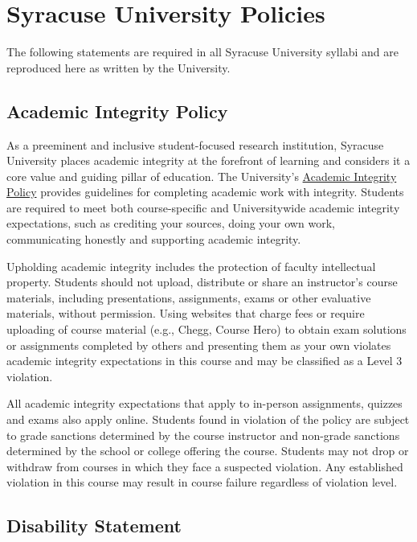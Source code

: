 \documentclass[12pt]{article}
\begin{document}
\newpage

\section*{Syracuse University Policies}

The following statements are required in all Syracuse University syllabi and are
reproduced here as written by the University.

\subsection*{Academic Integrity Policy}

As a preeminent and inclusive student-focused research institution, Syracuse University places academic integrity at the forefront of learning and considers it a core value and guiding pillar of education. The University's \href{https://policies.syr.edu/policies/academic-rules-student-responsibilities-and-services/academic-integrity-policy/}{Academic Integrity Policy} provides guidelines for completing academic work with integrity. Students are required to meet both course-specific and Universitywide academic integrity expectations, such as crediting your sources, doing your own work, communicating honestly and supporting academic integrity.

Upholding academic integrity includes the protection of faculty intellectual property. Students should not upload, distribute or share an instructor's course materials, including presentations, assignments, exams or other evaluative materials, without permission. Using websites that charge fees or require uploading of course material (e.g., Chegg, Course Hero) to obtain exam solutions or assignments completed by others and presenting them as your own violates academic integrity expectations in this course and may be classified as a Level 3 violation.

All academic integrity expectations that apply to in-person assignments, quizzes and exams also apply online. Students found in violation of the policy are subject to grade sanctions determined by the course instructor and non-grade sanctions determined by the school or college offering the course. Students may not drop or withdraw from courses in which they face a suspected violation. Any established violation in this course may result in course failure regardless of violation level.

\subsection*{Disability Statement}
\end{document}
